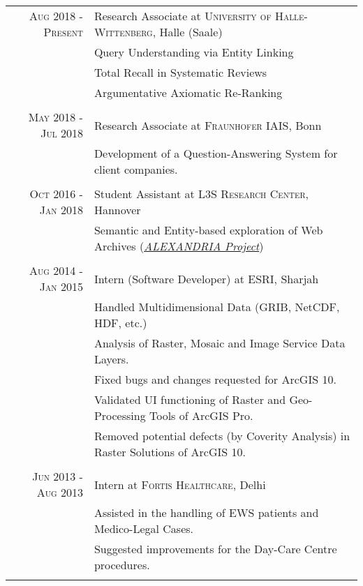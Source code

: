 \documentclass[a4paper,10pt]{article} %
\begin{document}
\begin{tabular}{r|p{11cm}}
\textsc{Aug 2018 - Present} & Research Associate at \textsc{University of Halle-Wittenberg}, Halle (Saale)
\\
& \footnotesize{Query Understanding via Entity Linking}\\
& \footnotesize{Total Recall in Systematic Reviews}\\
& \footnotesize{Argumentative Axiomatic Re-Ranking}\\
\multicolumn{2}{c}{} \\


\textsc{May 2018 - Jul 2018} & Research Associate at \textsc{Fraunhofer IAIS}, Bonn
\\
& \footnotesize{Development of a Question-Answering System for client companies.}\\
\multicolumn{2}{c}{} \\


\textsc{Oct 2016 - Jan 2018} & Student Assistant at \textsc{L3S Research Center}, Hannover
\\
& \footnotesize{Semantic and Entity-based exploration of Web Archives (\href{http://alexandria-project.eu/}{\emph{ALEXANDRIA Project}}})\\
\multicolumn{2}{c}{} \\


\textsc{Aug 2014 - Jan 2015} & Intern (Software Developer) at \textsc{ESRI}, Sharjah \\
& \footnotesize{Handled Multidimensional Data (GRIB, NetCDF, HDF, etc.)}\\
& \footnotesize{Analysis of Raster, Mosaic and Image Service Data Layers.}\\
& \footnotesize{Fixed bugs and changes requested for ArcGIS 10.}\\
& \footnotesize{Validated UI functioning of Raster and Geo-Processing Tools of ArcGIS Pro.}\\
& \footnotesize{Removed potential defects (by Coverity Analysis) in Raster Solutions of ArcGIS 10.}\\
\multicolumn{2}{c}{} \\


\textsc{Jun 2013 - Aug 2013} & Intern at \textsc{Fortis Healthcare}, Delhi \\
& \footnotesize{Assisted in the handling of EWS patients and Medico-Legal Cases.}\\
& \footnotesize{Suggested improvements for the Day-Care Centre procedures.}\\
\multicolumn{2}{c}{} \\


\end{tabular}
\end{document}

